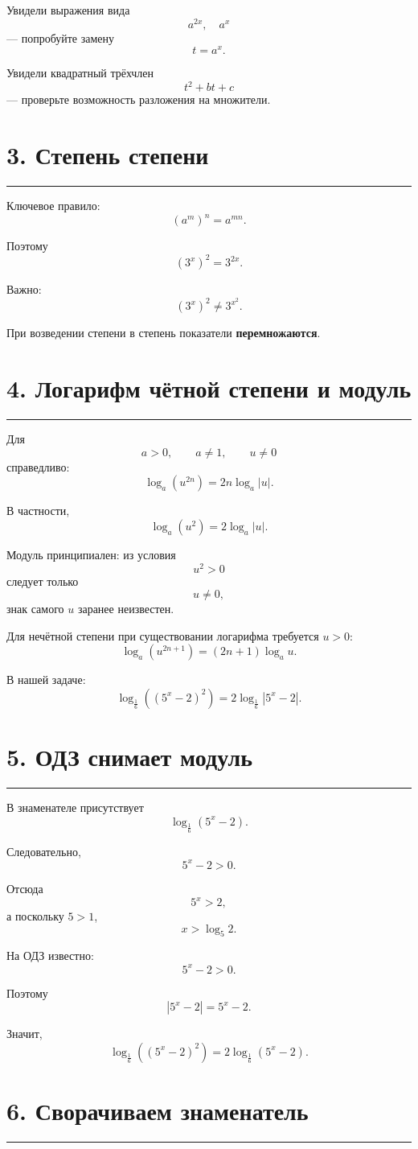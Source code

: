 \documentclass[a4paper,12pt]{article}
\newcommand{\topicline}{%
  \par\noindent
  {\color{accent!55}\rule{\linewidth}{0.6pt}}
  \par
}
\begin{document}
Увидели выражения вида
\[
a^{2x},\quad a^x
\]
--- попробуйте замену
\[
t=a^x.
\]

Увидели квадратный трёхчлен
\[
t^2+bt+c
\]
--- проверьте возможность разложения на множители.

\section*{\color{darkaccent}3. Степень степени}
\topicline

Ключевое правило:
\[
(a^m)^n=a^{mn}.
\]

Поэтому
\[
(3^x)^2=3^{2x}.
\]

Важно:
\[
(3^x)^2\ne 3^{x^2}.
\]

При возведении степени в степень показатели \textbf{перемножаются}.

\section*{\color{darkaccent}4. Логарифм чётной степени и модуль}
\topicline

Для
\[
a>0,\qquad a\ne1,\qquad u\ne0
\]
справедливо:
\[
\boxed{
\log_a(u^{2n})=2n\log_a|u|
}.
\]

В частности,
\[
\log_a(u^2)=2\log_a|u|.
\]

Модуль принципиален: из условия
\[
u^2>0
\]
следует только
\[
u\ne0,
\]
знак самого \(u\) заранее неизвестен.

Для нечётной степени при существовании логарифма требуется \(u>0\):
\[
\log_a(u^{2n+1})
=
(2n+1)\log_a u.
\]

В нашей задаче:
\[
\log_{\frac16}\!\left((5^x-2)^2\right)
=
2\log_{\frac16}|5^x-2|.
\]

\section*{\color{darkaccent}5. ОДЗ снимает модуль}
\topicline

В знаменателе присутствует
\[
\log_{\frac16}(5^x-2).
\]

Следовательно,
\[
5^x-2>0.
\]

Отсюда
\[
5^x>2,
\]
а поскольку \(5>1\),
\[
\boxed{x>\log_5 2}.
\]

На ОДЗ известно:
\[
5^x-2>0.
\]

Поэтому
\[
|5^x-2|=5^x-2.
\]

Значит,
\[
\log_{\frac16}\!\left((5^x-2)^2\right)
=
2\log_{\frac16}(5^x-2).
\]

\section*{\color{darkaccent}6. Сворачиваем знаменатель}
\topicline
\end{document}
